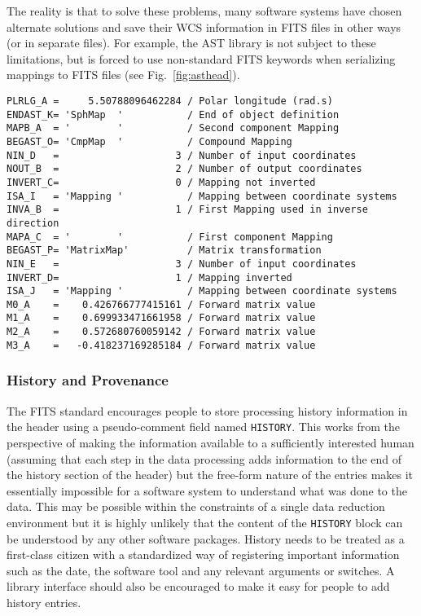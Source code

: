 \documentclass[final,authoryear,5p,times,twocolumn]{elsarticle}
\begin{document}
{{The reality is that to solve these problems, many software systems
have chosen alternate solutions and save their WCS information in FITS
files in other ways (or in separate files). For example, the AST
library \citep{1998ASPC..145...41W,2012ASPC..461..825B} is not subject
to these limitations, but 
is forced to use non-standard FITS keywords when serializing mappings 
to FITS files (see Fig.~\ref{fig:asthead}).


\begin{figure*}
\begin{minipage}{\textwidth}
\begin{center}
\begin{verbatim}
PLRLG_A =     5.50788096462284 / Polar longitude (rad.s)
ENDAST_K= 'SphMap  '           / End of object definition
MAPB_A  = '        '           / Second component Mapping
BEGAST_O= 'CmpMap  '           / Compound Mapping
NIN_D   =                    3 / Number of input coordinates
NOUT_B  =                    2 / Number of output coordinates
INVERT_C=                    0 / Mapping not inverted
ISA_I   = 'Mapping '           / Mapping between coordinate systems
INVA_B  =                    1 / First Mapping used in inverse direction
MAPA_C  = '        '           / First component Mapping
BEGAST_P= 'MatrixMap'          / Matrix transformation
NIN_E   =                    3 / Number of input coordinates
INVERT_D=                    1 / Mapping inverted
ISA_J   = 'Mapping '           / Mapping between coordinate systems
M0_A    =    0.426766777415161 / Forward matrix value
M1_A    =    0.699933471661958 / Forward matrix value
M2_A    =    0.572680760059142 / Forward matrix value
M3_A    =   -0.418237169285184 / Forward matrix value
\end{verbatim}
\end{center}
\caption{Example header of a representation of an AST WCS object in
  Native form.}
\label{fig:asthead}
\end{minipage}
\end{figure*}


\subsubsection{History and Provenance}


The FITS standard encourages people to store processing history
information in the header using a pseudo-comment field named
\texttt{HISTORY}. This works from the perspective of making the information
available to a sufficiently interested human (assuming that each step in the
data processing adds information to the end of the history section of the
header) but the free-form nature of the entries makes it essentially
impossible for a software system to understand what was done to the data.
This may be possible within the constraints of a single data reduction
environment but it is highly unlikely that the content of the
\texttt{HISTORY} block can be understood by any other software packages. History
needs to be treated as a first-class citizen with a standardized way of
registering important information such as the date, the software tool and
any relevant arguments or switches. A library interface should also be
encouraged to make it easy for people to add history entries.


}}
\end{document}

